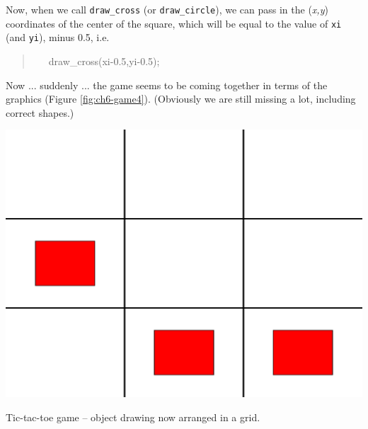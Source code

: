 \documentclass{tufte-book} %
\newenvironment{docspec}{\begin{quotation}\ttfamily\parskip0pt\parindent0pt\ignorespaces}{\end{quotation}}
\begin{document}
Now, when we call \texttt{draw\_cross} (or \texttt{draw\_circle}), we can pass in the (\textit{x,y}) coordinates of the   center of the square, which will be equal to the  value of \texttt{xi} (and \texttt{yi}), minus 0.5, i.e. 
\vspace{-1mm}\begin{docspec}
\ \ \     draw\_cross(xi-0.5,yi-0.5); 
\end{docspec}\vspace{-1mm}
Now ... suddenly ... the game seems to be coming together in terms of the graphics (Figure \ref{fig:ch6-game4}). (Obviously we are still missing a lot, including correct shapes.)

\begin{marginfigure}[0.0in]
\includegraphics[width=\linewidth]{ch6-game4.eps}
\caption{Tic-tac-toe game -- object drawing now arranged in a grid.}
\label{fig:ch6-game4}
\end{marginfigure}
\end{document}

